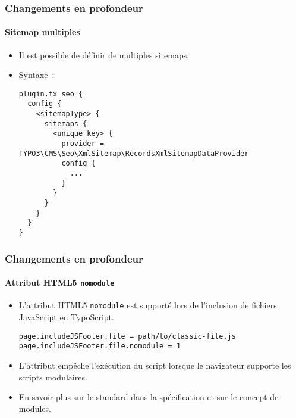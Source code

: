 
\begin{frame}[fragile]
	\frametitle{Changements en profondeur}
	\framesubtitle{Sitemap multiples}

	\lstset{basicstyle=\tiny\ttfamily}

	\begin{itemize}

		\item Il est possible de définir de multiples sitemaps.
		\item Syntaxe~:
\begin{lstlisting}
plugin.tx_seo {
  config {
    <sitemapType> {
      sitemaps {
        <unique key> {
          provider = TYPO3\CMS\Seo\XmlSitemap\RecordsXmlSitemapDataProvider
          config {
            ...
          }
        }
      }
    }
  }
}
\end{lstlisting}

	\end{itemize}

\end{frame}


\begin{frame}[fragile]
	\frametitle{Changements en profondeur}
	\framesubtitle{Attribut HTML5 \texttt{nomodule}}

	\lstset{basicstyle=\tiny\ttfamily}

	\begin{itemize}
		\item L'attribut HTML5 \texttt{nomodule} est supporté lors de l'inclusion de fichiers JavaScript en TypoScript.
\begin{lstlisting}
page.includeJSFooter.file = path/to/classic-file.js
page.includeJSFooter.file.nomodule = 1
\end{lstlisting}

		\item L'attribut empêche l'exécution du script lorsque le navigateur supporte les scripts modulaires.

		\item En savoir plus sur le standard dans la
			\href{https://html.spec.whatwg.org/multipage/scripting.html#attr-script-nomodule}{spécification}
			et sur le concept de
			\href{https://hacks.mozilla.org/2015/08/es6-in-depth-modules/}{modules}.

	\end{itemize}


\end{frame}

